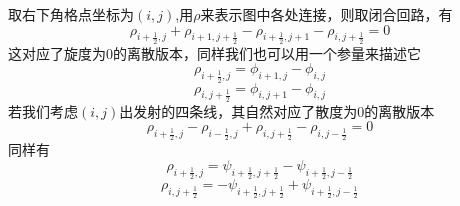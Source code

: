 \documentclass[a4paper]{book}
\begin{document}
取右下角格点坐标为$(i,j)$,用$\rho$来表示图中各处连接，则取闭合回路，有
\begin{equation}
	\rho_{i+\frac{1}{2},j}+\rho_{i+1,j+\frac{1}{2}}-\rho_{i+\frac{1}{2},j+1}-\rho_{i,j+\frac{1}{2}}=0
\end{equation}
这对应了旋度为0的离散版本，同样我们也可以用一个参量来描述它
\begin{equation}
\rho_{i+\frac{1}{2},j}=\phi_{i+1,j}-\phi_{i,j}
\end{equation}
\begin{equation}
	\rho_{i,j+\frac{1}{2}}=\phi_{i,j+1}-\phi_{i,j}
\end{equation}
若我们考虑$(i,j)$出发射的四条线，其自然对应了散度为0的离散版本
\begin{equation}
	\rho_{i+\frac{1}{2},j}-\rho_{i-\frac{1}{2},j}+\rho_{i,j+\frac{1}{2}}-\rho_{i,j-\frac{1}{2}}=0
\end{equation}
同样有
\begin{equation}
	\rho_{i+\frac{1}{2},j}=\psi_{i+\frac{1}{2},j+\frac{1}{2}}-\psi_{i+\frac{1}{2},j-\frac{1}{2}}
\end{equation}
\begin{equation}
	\rho_{i,j+\frac{1}{2}}=-\psi_{i+\frac{1}{2},j+\frac{1}{2}}+\psi_{i+\frac{1}{2},j-\frac{1}{2}}
\end{equation}





\end{document}
